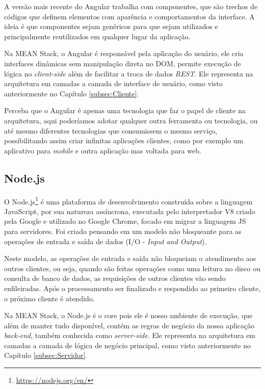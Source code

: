 \documentclass[
	12pt,				%
	openright,			%
	twoside,			%
	a4paper,			%
	english,			%
	brazil				%
	]{abntex2}
\begin{document}
A versão mais recente do Angular trabalha com componentes, que são trechos de códigos que definem elementos com aparência e comportamentos da interface. A ideia é que componentes sejam genéricos para que sejam utilizados e principalmente reutilizados em qualquer lugar da aplicação.

Na MEAN Stack, o Angular é responsável pela aplicação do usuário, ele cria interfaces dinâmicas sem manipulação direta no DOM, permite execução de lógica no \textit{client-side} além de facilitar a troca de dados \textit{REST}. Ele representa na arquitetura em camadas a camada de interface de usuário, como visto anteriormente no Capítulo \ref{subsec:Cliente}.

Perceba que o Angular é apenas uma tecnologia que faz o papel de cliente na arquitetura, aqui poderíamos adotar qualquer outra ferramenta ou tecnologia, ou até mesmo diferentes tecnologias que consumissem o mesmo serviço, possibilitando assim criar infinitas aplicações clientes, como por exemplo um aplicativo para \textit{mobile} e outra aplicação mas voltada para web.

\subsection{Node.js}

O Node.js\footnote{\url{https://nodejs.org/en/}} é uma plataforma de desenvolvimento construída sobre a linguagem JavaScript, por sua natureza assíncrona, executada pelo interpretador V8 criado pela Google e utilizado no Google Chrome, focado em migrar a linguagem JS para servidores. Foi criado pensando em um modelo não bloqueante para as operações de entrada e saída de dados (I/O - \textit{Input and Output}).

Neste modelo, as operações de entrada e saída não bloqueiam o atendimento aos outros clientes, ou seja, quando são feitas operações como uma leitura no disco ou consulta de banco de dados, as requisições de outros clientes vão sendo enfileiradas. Após o processamento ser finalizado e respondido ao primeiro cliente, o próximo cliente é atendido.

Na MEAN Stack, o Node.js é o core pois ele é nosso ambiente de execução, que além de manter tudo disponível, contém as regras de negócio da nossa aplicação \textit{back-end}, também conhecida como \textit{server-side}. Ele representa na arquitetura em camadas a camada de lógica de negócio principal, como visto anteriormente no Capítulo \ref{subsec:Servidor}.
\end{document}
